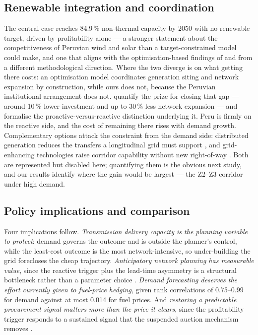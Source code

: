 \subsection{Renewable integration and coordination}

The central case reaches 84.9\,\% non-thermal capacity by 2050 with no renewable
target, driven by profitability alone --- a stronger statement about the
competitiveness of Peruvian wind and solar than a target-constrained model could make,
and one that aligns with the optimisation-based findings of \citet{fiestas2024} and
\citet{delacruz2024} from a different methodological direction. Where the two diverge
is on what getting there costs: an optimisation model coordinates generation siting and
network expansion by construction, while ours does not, because the Peruvian
institutional arrangement does not. \citet{herding2024} quantify the prize for closing
that gap --- around 10\,\% lower investment and up to 30\,\% less network expansion ---
and \citet{sauma2006} formalise the proactive-versus-reactive distinction underlying
it. Peru is firmly on the reactive side, and the cost of remaining there rises with
demand growth. Complementary options attack the constraint from the demand side:
distributed generation reduces the transfers a longitudinal grid must support
\citep{antoniolli2022,wu2025,sheng2026}, and grid-enhancing technologies raise corridor
capability without new right-of-way \citep{sadeghian2026}. Both are represented but
disabled here; quantifying them is the obvious next study, and our results identify
where the gain would be largest --- the Z2--Z3 corridor under high demand.

\subsection{Policy implications and comparison}

Four implications follow. \emph{Transmission delivery capacity is the planning variable
to protect}: demand governs the outcome and is outside the planner's control, while the
least-cost outcome is the most network-intensive, so under-building the grid forecloses
the cheap trajectory. \emph{Anticipatory network planning has measurable value},
since the reactive trigger plus the lead-time asymmetry is a structural bottleneck
rather than a parameter choice \citep{sauma2006,herding2024}. \emph{Demand forecasting
deserves the effort currently given to fuel-price hedging}, given rank correlations of
0.75--0.99 for demand against at most 0.014 for fuel prices. And \emph{restoring a predictable
procurement signal matters more than the price it clears}, since the profitability
trigger responds to a sustained signal that the suspended auction mechanism removes
\citep{campodonico2022,torres2026,delrio2026}.

